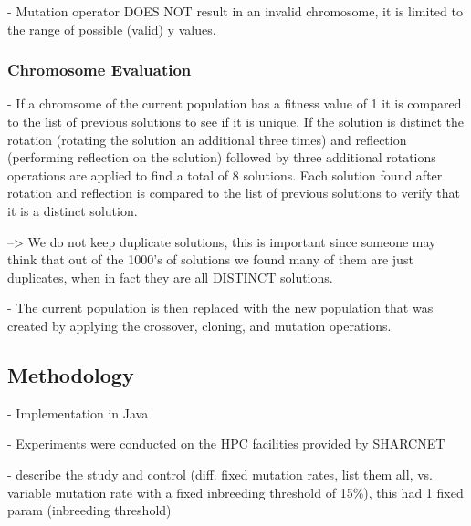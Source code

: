 \documentclass{sig-alternate}
\begin{document}
- Mutation operator DOES NOT result in an invalid chromosome, it is limited to the
  range of possible (valid) y values.


\subsubsection{Chromosome Evaluation}
- If a chromsome of the current population has a fitness value of 1 it is compared 
  to the list of previous solutions to see if it is unique. If the solution is 
  distinct the rotation (rotating the solution an additional three times) and 
  reflection (performing reflection on the solution) followed by three additional
  rotations operations are applied to find a total of 8 solutions. Each solution 
  found after rotation and reflection is compared to the list of previous solutions to 
  verify that it is a distinct solution.

  --> We do not keep duplicate solutions, this is important since someone may think
      that out of the 1000's of solutions we found many of them are just duplicates,
      when in fact they are all DISTINCT solutions.

- The current population is then replaced with the new population that was created
  by applying the crossover, cloning, and mutation operations.


\subsection{Methodology}

- Implementation in Java

- Experiments were conducted on the HPC facilities provided by SHARCNET

- describe the study and control (diff. fixed mutation rates, list them all, vs.
  variable mutation rate with a fixed inbreeding threshold of 15\%), this had
  1 fixed param (inbreeding threshold)
  
\end{document}
